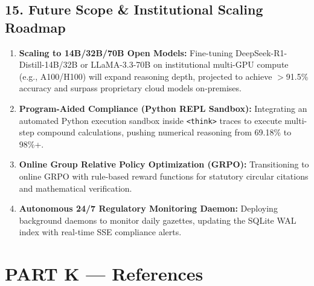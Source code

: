 \documentclass[11pt,a4paper]{article}
\begin{document}
\subsection*{15. Future Scope \& Institutional Scaling Roadmap}
\begin{enumerate}
    \item \textbf{Scaling to 14B/32B/70B Open Models:} Fine-tuning DeepSeek-R1-Distill-14B/32B or LLaMA-3.3-70B on institutional multi-GPU compute (e.g., A100/H100) will expand reasoning depth, projected to achieve $>$91.5\% accuracy and surpass proprietary cloud models on-premises.
    \item \textbf{Program-Aided Compliance (Python REPL Sandbox):} Integrating an automated Python execution sandbox inside \texttt{<think>} traces to execute multi-step compound calculations, pushing numerical reasoning from 69.18\% to 98\%+.
    \item \textbf{Online Group Relative Policy Optimization (GRPO):} Transitioning to online GRPO with rule-based reward functions for statutory circular citations and mathematical verification.
    \item \textbf{Autonomous 24/7 Regulatory Monitoring Daemon:} Deploying background daemons to monitor daily gazettes, updating the SQLite WAL index with real-time SSE compliance alerts.
\end{enumerate}

\section*{PART K --- References}
\renewcommand{\refname}{\vspace{-2em}}


\end{document}
